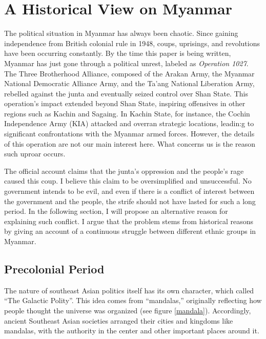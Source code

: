 \documentclass{article}
\begin{document}
\section{A Historical View on Myanmar}

The political situation in Myanmar has always been chaotic. Since gaining independence from British colonial rule in 1948, coups, uprisings, and revolutions have been occurring constantly. By the time this paper is being written, Myanmar has just gone through a political unrest, labeled as \textit{Operation 1027}. The Three Brotherhood Alliance, composed of the Arakan Army, the Myanmar National Democratic Alliance Army, and the Ta’ang National Liberation Army, rebelled against the junta and eventually seized control over Shan State.\autocite{yunsunOperation1027Changing2024} This operation's impact extended beyond Shan State, inspiring offensives in other regions such as Kachin and Sagaing. In Kachin State, for instance, the Cochin Independence Army (KIA) attacked and overran strategic locations, leadin:g to significant confrontations with the Myanmar armed forces.\autocite{theinternationalinstituteforstrategicstudiesOperation1027Reshapes2023} However, the details of this operation are not our main interest here. What concerns us is the reason such uproar occurs.

The official account claims that the junta's oppression and the people's rage caused this coup.\autocite{htetminlwinOperation1027End2023} I believe this claim to be oversimplified and unsuccessful. No government intends to be evil, and even if there is a conflict of interest between the government and the people, the strife should not have lasted for such a long period. In the following section, I will propose an alternative reason for explaining such conflict. I argue that the problem stems from historical reasons by giving an account of a continuous struggle between different ethnic groups in Myanmar.

\subsection{Precolonial Period}

The nature of southeast Asian politics itself has its own character, which \textcite{tambiahGalacticPolity2007} called ``The Galactic Polity''. This idea comes from ``mandalas,'' originally reflecting how people thought the universe was organized (see figure \ref{mandala}). Accordingly, ancient Southeast Asian societies arranged their cities and kingdoms like mandalas, with the authority in the center and other important places around it. 
\end{document}
